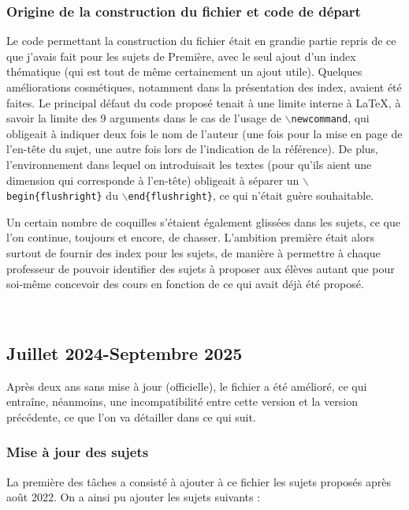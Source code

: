 \subsubsection{Origine de la construction du fichier et code de départ}
Le code permettant la construction du fichier était en grandie partie repris de ce que j'avais fait pour les sujets de Première, avec le seul ajout d'un index thématique (qui est tout de même certainement un ajout utile). Quelques améliorations cosmétiques, notamment dans la présentation des index, avaient été faites.
Le principal défaut du code proposé tenait à une limite interne à \LaTeX{}, à savoir la limite des 9 arguments dans le cas de l'usage de \texttt{$\backslash$newcommand}, qui obligeait à indiquer deux fois le nom de l'auteur (une fois pour la mise en page de l'en-tête du sujet, une autre fois lors de l'indication de la référence). De plus, l'environnement dans lequel on introduisait les textes (pour qu'ils aient une dimension qui corresponde à l'en-tête) obligeait à séparer un \texttt{$\backslash$begin\{flushright\}} du \texttt{$\backslash$end\{flushright\}}, ce qui n'était guère souhaitable.

Un certain nombre de coquilles s'étaient également glissées dans les sujets, ce que l'on continue, toujours et encore, de chasser. L'ambition première était alors surtout de fournir des index pour les sujets, de manière à permettre à chaque professeur de pouvoir identifier des sujets à proposer aux élèves autant que pour soi-même concevoir des cours en fonction de ce qui avait déjà été proposé.

\vfill{~}

\setcounter{subsection}{-1}
\subsection{Juillet 2024-Septembre 2025}

Après deux ans sans mise à jour (officielle), le fichier a été amélioré, ce qui entraîne, néanmoins, une incompatibilité entre cette version et la version précédente, ce que l'on va détailler dans ce qui suit.

\subsubsection{Mise à jour des sujets}

La première des tâches a consisté à ajouter à ce fichier les sujets proposés après août 2022. On a ainsi pu ajouter les sujets suivants :

